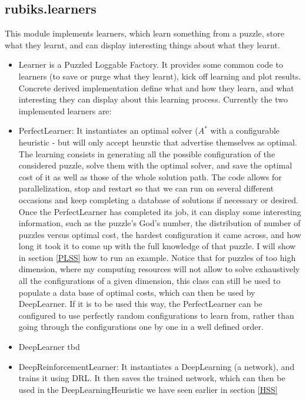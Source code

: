 \subsection{rubiks.learners}
\label{PLcode}
\label{DRLcode}
This module implements learners, which learn something from a puzzle, store what they learnt, and can display interesting things about what they learnt.

\begin{itemize}
\item Learner is a Puzzled Loggable Factory. It provides some common code to learners (to save or purge what they learnt), kick off learning and plot results. Concrete derived implementation define what and how they learn, and what interesting they can display about this learning process. Currently the two implemented learners are:
\item PerfectLearner: It instantiates an optimal solver ($A^{*}$ with a configurable heuristic - but will only accept heurstic that advertise themselves as optimal. The learning consists in generating all the possible configuration of the considered puzzle, solve them with the optimal solver, and save the optimal cost of it as well as those of the whole solution path. The code allows for parallelization, stop and restart so that we can run on several different occasions and keep completing a database of solutions if necessary or desired. Once the PerfectLearner has completed its job, it can display some interesting information, such as the puzzle's God's number, the distribution of number of puzzles versus optimal cost, the hardest configuration it came across, and how long it took it to come up with the full knowledge of that puzzle. I will show in section \ref{PLSS} how to run an example. Notice that for puzzles of too high dimension, where my computing resources will not allow to solve exhaustively all the configurations of a given dimension, this class can still be used to populate a data base of optimal costs, which can then be used by DeepLearner. If it is to be used this way, the PerfectLearner can be configured to use perfectly random configurations to learn from, rather than going through the configurations one by one in a well defined order.

\item DeepLearner tbd
\item DeepReinforcementLearner: It instantiates a DeepLearning (a network), and trains it using DRL. It then saves the trained network, which can then be used in the DeepLearningHeuristic we have seen earlier in section \ref{HSS}


\end{itemize}


